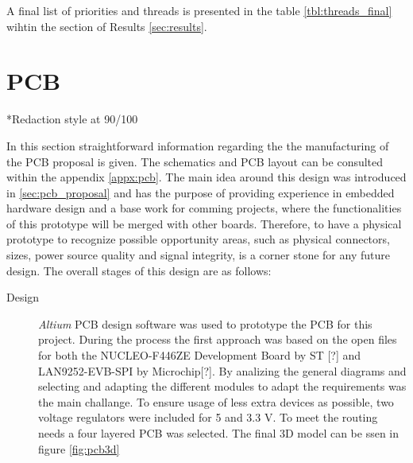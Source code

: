 A final list of priorities and threads is presented in the table \ref{tbl:threads_final} wihtin the section of Results \ref{sec:results}.



\section{PCB}
*Redaction style at 90/100


%   
In this section straightforward information regarding the the manufacturing of the PCB proposal is given.
The schematics and PCB layout can be consulted within the appendix \ref{appx:pcb}. The main idea around this design was introduced in 
\ref{sec:pcb_proposal} and has the purpose of providing experience in embedded hardware design and a base work for comming projects, where
the functionalities of this prototype will be merged with other boards. Therefore, to have a physical prototype to recognize
possible opportunity areas, such as physical connectors, sizes, power source quality and signal integrity, is a corner stone for any 
future design.
The overall stages of this design are as follows:
\begin{description}
\item[Design] \emph{Altium} PCB design software was used to prototype the PCB for this project. During the process the first approach was
                based on the open files for both the NUCLEO-F446ZE Development Board by ST [?] and LAN9252-EVB-SPI by Microchip[?]. By analizing
                the general diagrams and selecting and adapting the different modules to adapt the requirements was the main challange. To ensure
                usage of less extra devices as possible, two voltage regulators were included for 5 and 3.3 V.
                To meet the routing needs a four layered PCB was selected. The final 3D model can be ssen in figure \ref{fig:pcb3d}
\end{description}

